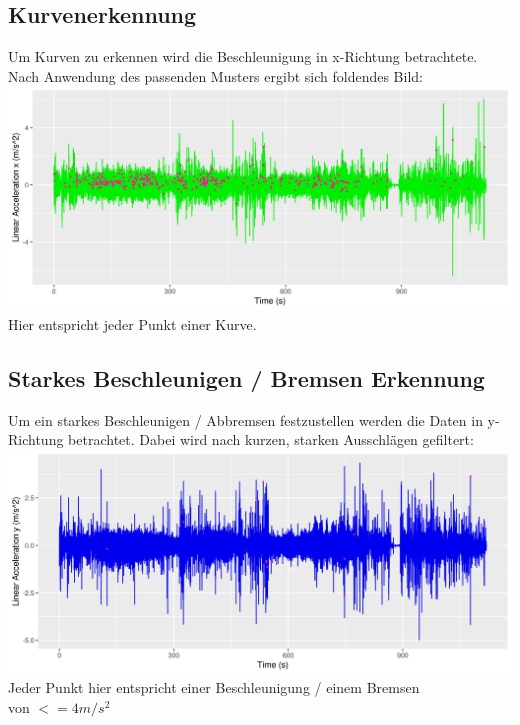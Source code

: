 \documentclass{article}
\begin{document}
\begin{multicols*}{3}
   \subsection*{Kurvenerkennung}
   Um Kurven zu erkennen wird die Beschleunigung in x-Richtung betrachtete. Nach Anwendung des passenden Musters ergibt sich foldendes Bild:
   \includegraphics[width=\linewidth]{../images/Calculations_cell_7_output_0}
   Hier entspricht jeder Punkt einer Kurve.
   \vfill\null
   \columnbreak
   \subsection*{Starkes Beschleunigen / Bremsen Erkennung}
   Um ein starkes Beschleunigen / Abbremsen festzustellen werden die Daten in y-Richtung betrachtet. Dabei wird nach kurzen, starken Ausschlägen gefiltert:
   \includegraphics[width=\linewidth]{../images/Calculations_cell_8_output_0}
   Jeder Punkt hier entspricht einer Beschleunigung / einem Bremsen\\ von $<=4m/s^{2}$

\end{multicols*}
\end{document}
